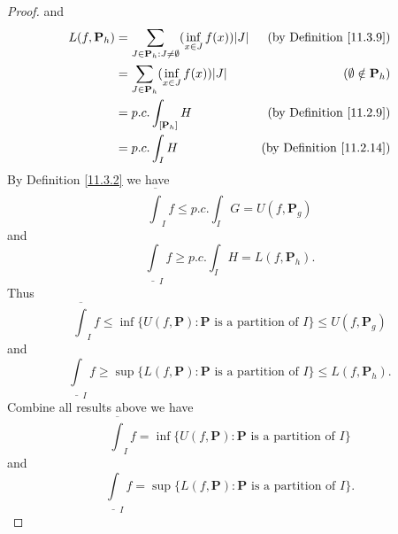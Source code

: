 \begin{proof}
    and
    \begin{align*}
        L(f, \mathbf{P}_h) & = \sum_{J \in \mathbf{P}_h : J \neq \emptyset} (\inf_{x \in J} f(x)) \abs*{J} & \text{(by Definition \ref{11.3.9})} \\
        & = \sum_{J \in \mathbf{P}_h} (\inf_{x \in J} f(x)) \abs*{J} & (\emptyset \notin \mathbf{P}_h) \\
        & = p.c. \int_{[\mathbf{P}_h]} H & \text{(by Definition \ref{11.2.9})} \\
        & = p.c. \int_I H & \text{(by Definition \ref{11.2.14})}
    \end{align*}
    By Definition \ref{11.3.2} we have
    \[
        \overline{\int}_I f \leq p.c. \int_I G = U(f, \mathbf{P}_g)
    \]
    and
    \[
        \underline{\int}_I f \geq p.c. \int_I H = L(f, \mathbf{P}_h).
    \]
    Thus
    \[
        \overline{\int}_I f \leq \inf \{U(f, \mathbf{P}) : \mathbf{P} \text{ is a partition of } I\} \leq U(f, \mathbf{P}_g)
    \]
    and
    \[
        \underline{\int}_I f \geq \sup \{L(f, \mathbf{P}) : \mathbf{P} \text{ is a partition of } I\} \leq L(f, \mathbf{P}_h).
    \]
    Combine all results above we have
    \[
        \overline{\int}_I f = \inf \{U(f, \mathbf{P}) : \mathbf{P} \text{ is a partition of } I\}
    \]
    and
    \[
        \underline{\int}_I f = \sup \{L(f, \mathbf{P}) : \mathbf{P} \text{ is a partition of } I\}.
    \]
\end{proof}